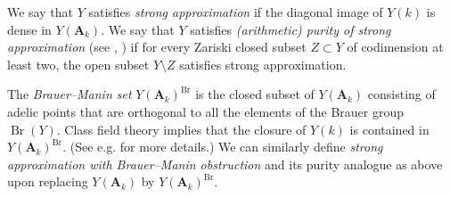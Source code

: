 \documentclass[11pt,letterpaper]{amsart}
\newcommand{\RA}{{\mathbf {A}}}
\theoremstyle{plain}
\numberwithin{equation}{section}
\theoremstyle{definition}
\theoremstyle{remark}
\begin{document}
		We say that $Y$ satisfies \emph{strong approximation} if the diagonal image of $Y(k)$ is dense in $Y(\RA_k)$. We say that $Y$ satisfies \emph{(arithmetic) purity of strong approximation} (see \cite[p. 336]{Cao-Liang-Xu}, \cite[Definition 1.3 (ii)]{Cao-Huang1}) if for every Zariski closed subset $Z\subset Y$ of codimension at least two, the open subset $Y\setminus Z$ satisfies strong approximation.

The \emph{Brauer--Manin set} $Y(\RA_k)^{\operatorname{Br}}$ is the closed subset of $Y(\RA_k)$ consisting of adelic points that are orthogonal to all the elements  of the Brauer group $\operatorname{Br}(Y)$. Class field theory implies that the closure of $Y(k)$ is contained in $Y(\RA_k)^{\operatorname{Br}}$. (See e.g. \cite[\S3.3]{PeyreBeyond} for more details.) We can similarly define \emph{strong approximation with Brauer--Manin obstruction} and its purity analogue as above upon replacing $Y(\RA_k)$ by $Y(\RA_k)^{\operatorname{Br}}$.
\end{document}
